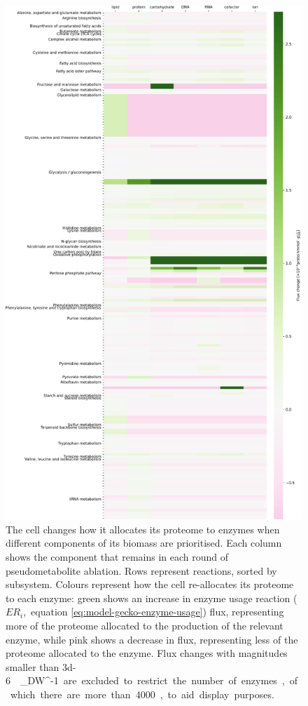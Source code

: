 \begin{figure}
  \centering
  \includegraphics[width=.8\linewidth]{abl_vs_enz_use_plots_adapted}
  \caption{
    The cell changes how it allocates its proteome to enzymes when different components of its biomass are prioritised.
    Each column shows the component that remains in each round of pseudometabolite ablation.
    Rows represent reactions, sorted by subsystem.
    Colours represent how the cell re-allocates its proteome to each enzyme: green shows an increase in enzyme usage reaction ($ER_{i}$,~equation \ref{eq:model-gecko-enzyme-usage}) flux, representing more of the proteome allocated to the production of the relevant enzyme, while pink shows a decrease in flux, representing less of the proteome allocated to the enzyme.
    Flux changes with magnitudes smaller than \SI{3d-6}{\milli\mole~\gram_{DW}^{-1}} are excluded to restrict the number of enzymes, of which there are more than \num{4000}, to aid display purposes.
  }
  \label{fig:model-ablate-enz-use}
\end{figure}

